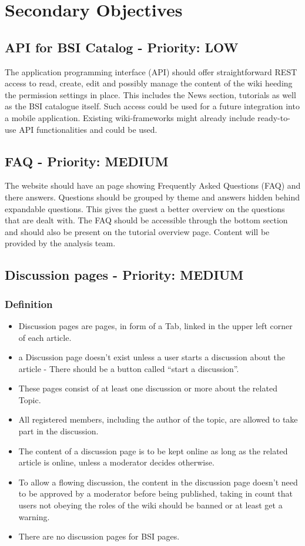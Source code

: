 \chapter{Secondary Objectives}
\section{API for BSI Catalog - Priority: LOW}
The application programming interface (API) should offer straightforward REST access to read, create, edit and possibly manage the content of the wiki heeding the permission settings in place.
This includes the News section, tutorials as well as the BSI catalogue itself.
Such access could be used for a future integration into a mobile application.
Existing wiki-frameworks might already include ready-to-use API functionalities and could be used.


\section{FAQ - Priority: MEDIUM}



The website should have an page showing Frequently Asked Questions (FAQ) and there answers.
Questions should be grouped by theme and answers hidden behind expandable questions. 
This gives the guest a better overview on the questions that are dealt with.
The FAQ should be accessible through the bottom section and should also be present on the tutorial overview page.
Content will be provided by the analysis team.

\section{Discussion pages - Priority: MEDIUM}
\subsection{Definition}
\begin{itemize}
\item Discussion pages are pages, in form of a Tab, linked in the upper left corner of each article. 
\item a Discussion page doesn’t exist unless a user starts a discussion about the article - There should be a button called “start a discussion”.
\item These pages consist of at least one discussion or more about the related Topic. 
\item All registered members, including the author of the topic, are allowed to take part in the discussion.
\item The content of a discussion page is to be kept online as long as the related article is online, unless a moderator decides otherwise.
\item To allow a flowing discussion, the content in the discussion page doesn’t need to be approved by a moderator before being published, taking in count that users not obeying the roles of the wiki should be banned or at least get a warning.
\item There are no discussion pages for BSI pages.
 \end{itemize}


